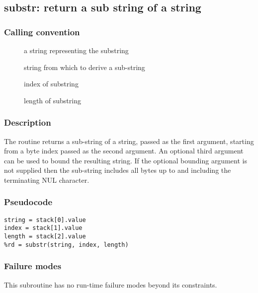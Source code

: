 \clearpage
{}
{}
\label{subr:substr}
\subsection*{substr: return a sub string of a string}

\subsubsection*{Calling convention}

\begin{description}
\item[] a string representing the substring
\item[] string from which to derive a sub-string
\item[] index of substring
\item[] length of substring
\end{description}

\subsubsection*{Description}

The  routine returns a sub-string of a string,
passed as the first argument, starting from a byte index passed as the
second argument.  An optional third argument can be used to bound the
resulting string.  If the optional bounding argument is not supplied
then the sub-string includes all bytes up to and including the
terminating NUL character.

\subsubsection*{Pseudocode}

\begin{verbatim}
string = stack[0].value
index = stack[1].value
length = stack[2].value
%rd = substr(string, index, length)
\end{verbatim}

\subsubsection*{Failure modes}

This subroutine has no run-time failure modes beyond its constraints.
